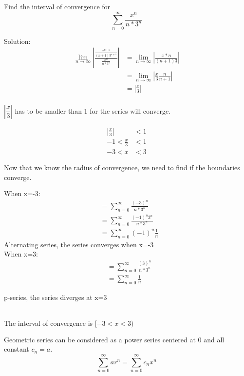 	\begin{simple}{}{}
	Find the interval of convergence for
	$$\sum^\infty_{n=0}\frac{x^n}{n*3^n}$$
	
    Solution:
    \begin{align*}
    \displaystyle
        \lim_{n\to\infty}\left|\frac{\frac{x^{n+1}}{(n+1)3^{n+1}}}{\frac{x^n}{n*3^n}}\right|&=\lim_{n\to\infty}\left|\frac{x*n}{(n+1)3}\right|\\
        &=\lim_{n\to\infty}\left|\frac{x}{3}\frac{n}{n+1}\right|\\
        &=\left|\frac{x}{3}\right|\\
    \end{align*}
    
    $\left|\dfrac{x}{3}\right|$ has to be smaller than 1 for the series will converge.
    
    \begin{align*}
        \left|\frac{x}{3}\right|&<1\\
        -1<\frac{x}{3}&<1\\
        -3<x&<3
    \end{align*}
    
    Now that we know the radius of convergence, we need to find if the boundaries converge.
    
    \begin{multicols}{2}
    When x=-3:
    \begin{align*}
        &=\sum^\infty_{n=0}\frac{(-3)^n}{n*3^n}\\
        &=\sum^\infty_{n=0}\frac{(-1)^n3^n}{n*3^n}\\
        &=\sum^\infty_{n=0}(-1)^n\frac{1}{n}
    \end{align*}
    {Alternating series, the series converges when x=-3}\\
    When x=3:
    \begin{align*}
        &=\sum^\infty_{n=0}\frac{(3)^n}{n*3^n}\\
        &=\sum^\infty_{n=0}\frac{1}{n}
    \end{align*}
    
    p-series, the series diverges at x=3\\\\
    \end{multicols}
    
    The interval of convergence is $[-3<x<3)$
	\end{simple}
	
	\noindent Geometric series can be considered as a power series centered at 0 and all constant $c_n=a$.$$\sum^\infty_{n=0} ar^n=\sum^\infty_{n=0}c_nx^n$$
	
